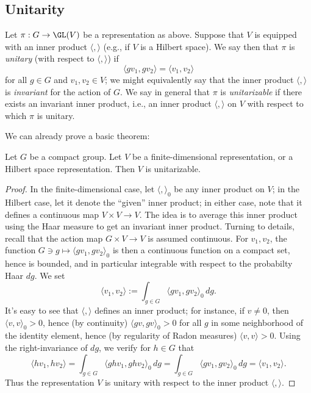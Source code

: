 \documentclass[reqno]{amsart} 
\begin{document}
\subsection{Unitarity}

\begin{definition}
  Let $\pi : G \rightarrow \GL(V)$ be a representation as above.  Suppose that $V$ is equipped with an inner product $\langle , \rangle$ (e.g., if $V$ is a Hilbert space).  We say then that $\pi$ is \emph{unitary} (with respect to $\langle , \rangle$) if
  \begin{equation*}
    \langle g v_1, g v_2 \rangle = \langle v_1, v_2 \rangle
  \end{equation*}
  for all $g \in G$ and $v_1, v_2 \in V$; we might equivalently say that the inner product $\langle , \rangle$ is \emph{invariant} for the action of $G$.  We say in general that $\pi$ is \emph{unitarizable} if there exists an invariant inner product, i.e., an inner product $\langle , \rangle$ on $V$ with respect to which $\pi$ is unitary.
\end{definition}
We can already prove a basic theorem:
\begin{theorem}\label{thm:compact-unitarizability}
  Let $G$ be a compact group.  Let $V$ be a finite-dimensional representation, or a Hilbert space representation.  Then $V$ is unitarizable.
\end{theorem}
\begin{proof}
  In the finite-dimensional case, let $\langle , \rangle_0$ be any inner product on $V$; in the Hilbert case, let it denote the ``given'' inner product; in either case, note that it defines a continuous map $V \times V \rightarrow V$.  The idea is to average this inner product using the Haar measure to get an invariant inner product.  Turning to details, recall that the action map $G \times V \rightarrow V$ is assumed continuous.  For $v_1, v_2$, the function $G \ni g \mapsto \langle g v_1, g v_2 \rangle_0$ is then a continuous function on a compact set, hence is bounded, and in particular integrable with respect to the probabilty Haar $d g$.  We set
  \begin{equation*}
    \langle v_1, v_2 \rangle := \int_{g \in G} \langle g v_1, g v_2 \rangle_0 \, d g.
  \end{equation*}
  It's easy to see that $\langle , \rangle$ defines an inner product; for instance, if $v \neq 0$, then $\langle v,v \rangle_0 > 0$, hence (by continuity) $\langle g v, g v \rangle_0 > 0$ for all $g$ in some neighborhood of the identity element, hence (by regularity of Radon measures) $\langle v, v \rangle > 0$.  Using the right-invariance of $d g$, we verify for $h \in G$ that
  \begin{equation*}
    \langle h v_1, h v_2 \rangle = \int_{g \in G} \langle g h v_1, g h v_2 \rangle_0 \, d g = \int_{g \in G} \langle g v_1, g v_2 \rangle_0 \, d g = \langle v_1, v_2 \rangle.
  \end{equation*}
  Thus the representation $V$ is unitary with respect to the inner product $\langle , \rangle$.
\end{proof}
\end{document}
